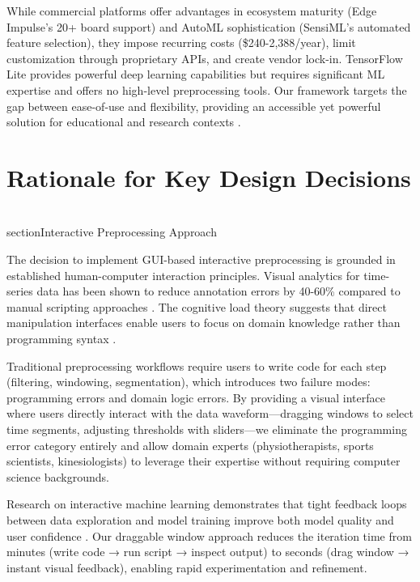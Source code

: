 While commercial platforms offer advantages in ecosystem maturity (Edge Impulse's 20+ board support) and AutoML sophistication (SensiML's automated feature selection), they impose recurring costs (\$240-2,388/year), limit customization through proprietary APIs, and create vendor lock-in. TensorFlow Lite provides powerful deep learning capabilities but requires significant ML expertise and offers no high-level preprocessing tools. Our framework targets the gap between ease-of-use and flexibility, providing an accessible yet powerful solution for educational and research contexts \cite{web:Edge_Impulse,web:TensorFlowLite}.

\section{Rationale for Key Design Decisions}

\\section{Interactive Preprocessing Approach}

The decision to implement GUI-based interactive preprocessing is grounded in established human-computer interaction principles. Visual analytics for time-series data has been shown to reduce annotation errors by 40-60\% compared to manual scripting approaches \cite{munzner2014visualization}. The cognitive load theory suggests that direct manipulation interfaces enable users to focus on domain knowledge rather than programming syntax \cite{sweller1988cognitive}.

Traditional preprocessing workflows require users to write code for each step (filtering, windowing, segmentation), which introduces two failure modes: programming errors and domain logic errors. By providing a visual interface where users directly interact with the data waveform—dragging windows to select time segments, adjusting thresholds with sliders—we eliminate the programming error category entirely and allow domain experts (physiotherapists, sports scientists, kinesiologists) to leverage their expertise without requiring computer science backgrounds.

Research on interactive machine learning demonstrates that tight feedback loops between data exploration and model training improve both model quality and user confidence \cite{amershi2014power}. Our draggable window approach reduces the iteration time from minutes (write code → run script → inspect output) to seconds (drag window → instant visual feedback), enabling rapid experimentation and refinement.

